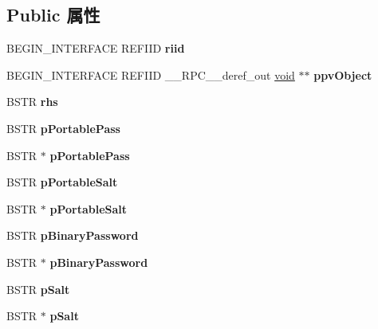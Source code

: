 \subsection*{Public 属性}
\begin{DoxyCompactItemize}
\item 
\mbox{\label{struct_i_ms_tsc_non_scriptable_vtbl_a26b30126c50cc0afe20c1642e8e90914}} 
B\+E\+G\+I\+N\+\_\+\+I\+N\+T\+E\+R\+F\+A\+CE R\+E\+F\+I\+ID {\bfseries riid}
\item 
\mbox{\label{struct_i_ms_tsc_non_scriptable_vtbl_a27482e9e132ac18008fc17f00eac7e38}} 
B\+E\+G\+I\+N\+\_\+\+I\+N\+T\+E\+R\+F\+A\+CE R\+E\+F\+I\+ID \+\_\+\+\_\+\+R\+P\+C\+\_\+\+\_\+deref\+\_\+out \hyperlink{interfacevoid}{void} $\ast$$\ast$ {\bfseries ppv\+Object}
\item 
\mbox{\label{struct_i_ms_tsc_non_scriptable_vtbl_ab71e4dda0ffe489dd3b78b6b685550ac}} 
B\+S\+TR {\bfseries rhs}
\item 
\mbox{\label{struct_i_ms_tsc_non_scriptable_vtbl_ae543a8a4716ec69de080b600ddf2c8ae}} 
B\+S\+TR {\bfseries p\+Portable\+Pass}
\item 
\mbox{\label{struct_i_ms_tsc_non_scriptable_vtbl_abe139c7810ce8f154772cd9e4d45def5}} 
B\+S\+TR $\ast$ {\bfseries p\+Portable\+Pass}
\item 
\mbox{\label{struct_i_ms_tsc_non_scriptable_vtbl_a608b6fadb30f205ce345507d32188e63}} 
B\+S\+TR {\bfseries p\+Portable\+Salt}
\item 
\mbox{\label{struct_i_ms_tsc_non_scriptable_vtbl_a2f0319eecef26d9ae63f5a01f4093487}} 
B\+S\+TR $\ast$ {\bfseries p\+Portable\+Salt}
\item 
\mbox{\label{struct_i_ms_tsc_non_scriptable_vtbl_a4191b0559c01befd4539dda07fedf6ee}} 
B\+S\+TR {\bfseries p\+Binary\+Password}
\item 
\mbox{\label{struct_i_ms_tsc_non_scriptable_vtbl_a4b31b6a1fe9e845f37e7569ae8eca773}} 
B\+S\+TR $\ast$ {\bfseries p\+Binary\+Password}
\item 
\mbox{\label{struct_i_ms_tsc_non_scriptable_vtbl_a20444039ac6f40de3d5815d7bfa3a3b5}} 
B\+S\+TR {\bfseries p\+Salt}
\item 
\mbox{\label{struct_i_ms_tsc_non_scriptable_vtbl_ac0251e5418efc0d849004b3ff49bce6a}} 
B\+S\+TR $\ast$ {\bfseries p\+Salt}
\end{DoxyCompactItemize}


